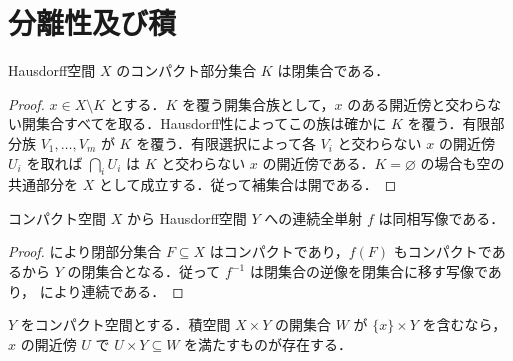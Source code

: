 \section{分離性及び積}
\begin{prop}[Hausdorff空間のコンパクト部分集合]
Hausdorff空間 $X$ のコンパクト部分集合 $K$ は閉集合である．
\end{prop}
\begin{proof}
$x\in X\setminus K$ とする．$K$ を覆う開集合族として，$x$ のある開近傍と交わらない開集合すべてを取る．Hausdorff性によってこの族は確かに $K$ を覆う．有限部分族 $V_1,\ldots,V_m$ が $K$ を覆う．有限選択によって各 $V_i$ と交わらない $x$ の開近傍 $U_i$ を取れば $\bigcap_i U_i$ は $K$ と交わらない $x$ の開近傍である．$K=\varnothing$ の場合も空の共通部分を $X$ として成立する．従って補集合は開である．
\end{proof}
\begin{prop}[コンパクト空間からHausdorff空間への全単射]
コンパクト空間 $X$ から Hausdorff空間 $Y$ への連続全単射 $f$ は同相写像である．
\end{prop}
\begin{proof}
 により閉部分集合 $F\subseteq X$ はコンパクトであり，$f(F)$ もコンパクトであるから $Y$ の閉集合となる．従って $f^{-1}$ は閉集合の逆像を閉集合に移す写像であり， により連続である．
\end{proof}
\begin{prop}[コンパクトな因子と管状近傍]
$Y$ をコンパクト空間とする．積空間 $X\times Y$ の開集合 $W$ が $\{x\}\times Y$ を含むなら，$x$ の開近傍 $U$ で $U\times Y\subseteq W$ を満たすものが存在する．
\end{prop}
